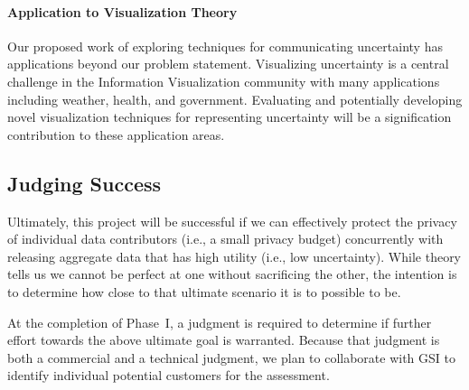 
\paragraph{Application to Visualization Theory} 
Our proposed work of exploring techniques for communicating uncertainty has applications beyond our problem statement. Visualizing uncertainty is a central challenge in the Information Visualization community with many applications including weather, health, and government. Evaluating and potentially developing novel visualization techniques for representing uncertainty will be a signification contribution to these application areas.  


\subsection{Judging Success}
\label{sec:exp}

Ultimately, this project will be successful if we can effectively
protect the privacy of individual data contributors (i.e., a small
privacy budget) concurrently with releasing aggregate data that has
high utility (i.e., low uncertainty).  While theory tells us we cannot
be perfect at one without sacrificing the other, the intention
is to determine how close to that ultimate scenario it is to possible to be.

At the completion of Phase~I, a judgment is required to determine if
further effort towards the above ultimate goal is warranted.
Because that judgment is both a commercial and a technical judgment, we
plan to collaborate with GSI to identify individual potential
customers for the assessment.

